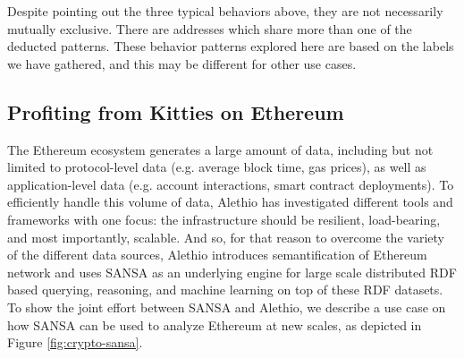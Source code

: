 Despite pointing out the three typical behaviors above, they are not necessarily mutually exclusive.
There are addresses which share more than one of the deducted patterns.
These behavior patterns explored here are based on the labels we have gathered, and this may be different for other use cases.


\subsection{Profiting from Kitties on Ethereum}
\label{sec:kitties-use-case}

The Ethereum ecosystem generates a large amount of data, including but not limited to protocol-level data (e.g. average block time, gas prices), as well as application-level data (e.g. account interactions, smart contract deployments). 
To efficiently handle this volume of data, Alethio has investigated different tools and frameworks with one focus: the infrastructure should be resilient, load-bearing, and most importantly, scalable.
And so, for that reason to overcome the variety of the different data sources, Alethio introduces semantification of Ethereum network and uses SANSA as an underlying engine for large scale distributed \gls{RDF} based querying, reasoning, and machine learning on top of these \gls{RDF} datasets.
To show the joint effort between SANSA and Alethio, we describe a use case on how SANSA can be used to analyze Ethereum at new scales, as depicted in Figure \ref{fig:crypto-sansa}. 


